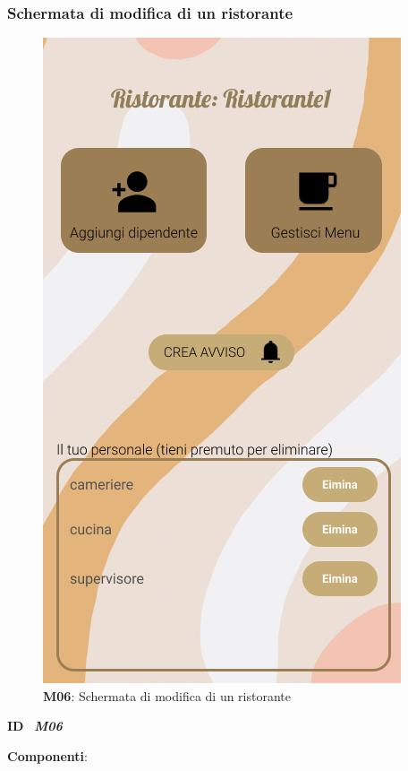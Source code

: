         \subsubsection{Schermata di modifica di un ristorante}
        \begin{figure}[H]
            \centering
            \includegraphics[scale=0.4]{assets/Mockup/Mockup_ResturantDash.png}
            \caption{\textbf{M06}: Schermata di modifica di un ristorante}\label{fig:Mockup_ResturantManager}
        \end{figure}
        \begin{flushleft}
            \textbf{ID} \ \Large{\textit{\textbf{M06}}}
        \end{flushleft}

        \textbf{Componenti}:

